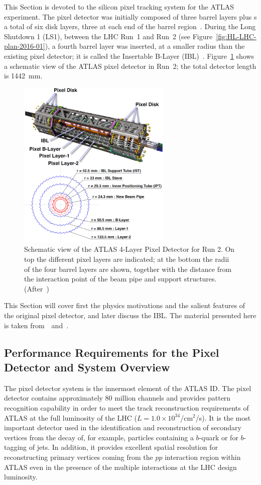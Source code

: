 This Section is devoted to the silicon pixel tracking system for the ATLAS experiment. 
The pixel detector was initially composed of three barrel layers plus s a total of six disk layers, three at 
each end of the barrel region~\cite{AtlasPixels}. During the Long Shutdown 1 (LS1), between 
the LHC Run~1 and Run~2 (see Figure~\ref{fig:HL-LHC-plan-2016-01}), a fourth barrel layer was inserted, at a smaller radius than the existing 
pixel detector; it is called the Insertable B-Layer (IBL)~\cite{IBLTDR}.
Figure~\ref{fig:ATLASPixels} shows a schematic view of the ATLAS pixel detector in Run~2; the total 
detector length is 1442~mm. 
\begin{figure}[!htbp]
\centering
\includegraphics[width=0.65\textwidth]{ATLASPixels.jpg}
\caption{\label{fig:ATLASPixels}Schematic view of the ATLAS 4-Layer Pixel Detector for Run 2. 
On top the different pixel layers are indicated; at the bottom the radii of the four barrel layers are shown, together with the distance from the interaction point of the beam pipe and support structures. (After~\cite{BACKHAUS201665})}
\end{figure}

This Section will cover first the physics motivations and the salient features of the original pixel detector, and later discuss the IBL. The material presented here is taken from~\cite{AtlasPixels}~and~\cite{IBLTDR}.

\subsection{Performance Requirements for the Pixel Detector and System Overview}
\label{sec:pixeloverview}
The pixel detector system is the innermost element of the ATLAS ID. The pixel detector contains 
approximately 80 million channels and provides pattern recognition capability in order to meet the track 
reconstruction requirements of ATLAS at the full luminosity of the LHC ($L=1.0\times10^{34}$/cm$^{2}$/s). It is the most important detector used in the identification and reconstruction of secondary vertices from the decay of, for example, particles containing a $b$-quark or for $b$-tagging of jets. In addition, it provides excellent spatial resolution for reconstructing primary vertices coming from the $pp$ interaction region within ATLAS even in the presence of the multiple interactions at the LHC design luminosity. 

